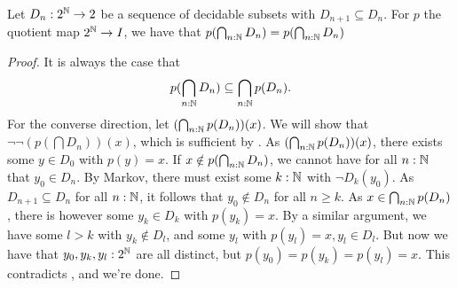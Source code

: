 \begin{lemma}
  Let $D_n:2^{\mathbb{N}} \to 2$ be a sequence of decidable subsets with $D_{n+1}\subseteq D_n$.
  For $p$ the quotient map $2^{\mathbb{N}} \to I$, we have that 
  $p(\bigcap_{n:\mathbb{N}} D_n) = p(\bigcap_{n:\mathbb{N}} D_n)$
\end{lemma}
\begin{proof}
  It is always the case that $$p(\bigcap_{n:\mathbb{N}} D_n) \subseteq \bigcap_{n:\mathbb{N}} p(D_n).$$
  For the converse direction, let $(\bigcap_{n:\mathbb{N}} p(D_n))(x)$. 
  We will show that $ \neg \neg (p(\bigcap D_n)) (x)$, which is sufficient by . 
%
  As $(\bigcap_{n:\mathbb{N}} p(D_n))(x)$, there exists some $y\in D_0$ with $p(y) = x$. 
%
  If $x\notin p(\bigcap_{n:\mathbb{N}} D_n)$, we cannot have for all $n:\mathbb{N}$ that $y_0 \in  D_n$. 
  By Markov, there must exist some $k:\mathbb{N}$ with $\neg D_k(y_0)$. 
  As $D_{n+1}\subseteq D_n$ for all $n:\mathbb{N}$, it follows that $y_0\notin D_n$ for all $n\geq k$. 
%
  As $x\in \bigcap_{n:\mathbb{N}}p(D_n)$, there is however some $y_k\in D_k$ with $p(y_k) = x$. 
  By a similar argument, we have some $l>k$ with $y_k\notin D_l$, and some $y_l$ with $p(y_l) = x, y_l \in D_l$. 
  But now we have that $y_0, y_k, y_l:2^{\mathbb{N}}$ are all distinct, but $p(y_0) = p(y_k) = p(y_l) = x$. 
  This contradicts , and we're done. 
\end{proof}


